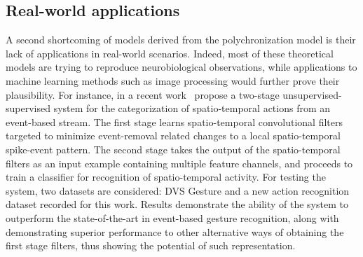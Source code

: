 \documentclass[brainsci, %
               review,submit,pdftex,moreauthors
               ]{Definitions/mdpi}
\begin{document}







\subsection{Real-world applications}
A second shortcoming of models derived from the polychronization model is their lack of applications in real-world scenarios. Indeed, most of these theoretical models are trying to reproduce neurobiological observations, while applications to machine learning methods such as image processing would further prove their plausibility. For instance, in a recent work~\citet{ghosh_spatiotemporal_2019} propose a two-stage unsupervised-supervised system for the categorization of spatio-temporal actions from an event-based stream. The first stage learns spatio-temporal convolutional filters targeted to minimize event-removal related changes to a local spatio-temporal spike-event pattern. The second stage takes the output of the spatio-temporal filters as an input example containing multiple feature channels, and proceeds to train a classifier for recognition of spatio-temporal activity. For testing the system, two datasets are considered: DVS Gesture and a new action recognition dataset recorded for this work. Results demonstrate the ability of the system to outperform the state-of-the-art in event-based gesture recognition, along with demonstrating superior performance to other alternative ways of obtaining the first stage filters, thus showing the potential of such representation. 
\end{document}
